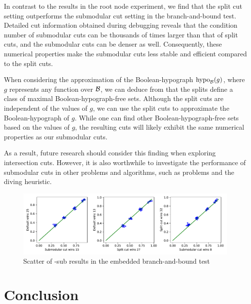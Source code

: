 In contrast to the results in the root node experiment, we find that the split cut setting outperforms the submodular cut setting in the branch-and-bound test. Detailed cut information obtained during debugging reveals that the condition number of submodular cuts can be thousands of times larger than that of split cuts, and the submodular cuts can be denser as well. Consequently, these numerical properties make the submodular cuts less stable and efficient compared to the split cuts.

When considering the approximation of the Boolean-hypograph $\operatorname{hypo}_{\mathcal B}(g)$, where $g$ represents any function over $\mathcal B$, we can deduce from  that the splits define a class of maximal Boolean-hypograph-free sets. Although the split cuts are independent of  the values of $g$,  we can use the split cuts to approximate the Boolean-hypograph of $g$.  While one can find other Boolean-hypograph-free sets based on the values of $g$, the resulting cuts will likely exhibit the same numerical properties as our submodular cuts.

As a result, future research should consider this finding when exploring intersection cuts. However, it is also worthwhile to investigate the performance of submodular cuts in other problems and algorithms, such as \pbm problems and the diving heuristic.






\begin{figure}[h]
    \centering
    \includegraphics[width=0.99\textwidth]{Chaptersub/media/scatter_qubo_bc.pdf}
    \caption{Scatter of \maxcut-sub results in the embedded branch-and-bound test}
    \label{fig:qubo3}
\end{figure}

\section{Conclusion}\label{sec13}


